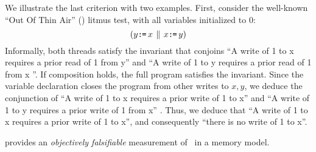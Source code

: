 We illustrate the last criterion with two examples.   
First, consider the well-known ``Out Of Thin Air'' (\oota) litmus test, with all variables initialized to $0$:
\begin{equation}
  \label{oota1}
  (y\texttt{:}\mkern-1mu\texttt{=}\, x \,\mathbin{\|}\, x \texttt{:}\mkern-1mu\texttt{=}\, y)
\end{equation}
Informally, both threads satisfy the invariant that conjoins ``A write of 1  to x  requires a prior read  of 1 from y'' and ``A write of 1  to y  requires a prior read  of 1 from x ''.  If composition holds, the full program satisfies the invariant.  Since the variable declaration closes the program from other writes to $x,y$, we  deduce the conjunction of  ``A write of 1  to x  requires a prior write  of 1 to x'' and ``A write of 1  to y  requires a prior write  of 1 from x'' . Thus, we deduce that ``A write of 1  to x  requires a prior write  of 1 to x'', and consequently ``there is no write of 1 to x''. 

provides an  {\em objectively  falsifiable} measurement of \oota\ in a memory model. 



